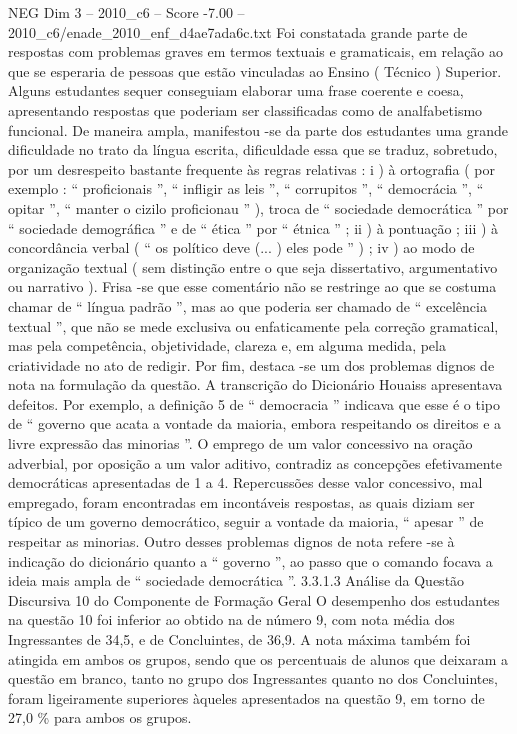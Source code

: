 \begin{textsample}{NEG Dim 3 – 2010\_c6 – Score -7.00 – 2010\_c6/enade\_2010\_enf\_d4ae7ada6c.txt}
Foi constatada grande parte de respostas com problemas graves em termos textuais e gramaticais, em relação ao que se esperaria de pessoas que estão vinculadas ao Ensino ( Técnico ) Superior.
Alguns estudantes sequer conseguiam elaborar uma frase coerente e coesa, apresentando respostas que poderiam ser classificadas como de analfabetismo funcional.
De maneira ampla, manifestou -se da parte dos estudantes uma grande dificuldade no trato da língua escrita, dificuldade essa que se traduz, sobretudo, por um desrespeito bastante frequente às regras relativas : i ) à ortografia ( por exemplo : “ proficionais ”, “ infligir as leis ”, “ corrupitos ”, “ democrácia ”, “ opitar ”, “ manter o cizilo proficionau ” ), troca de “ sociedade democrática ” por “ sociedade demográfica ” e de “ ética ” por “ étnica ” ; ii ) à pontuação ; iii ) à concordância verbal ( “ os político deve (... ) eles pode ” ) ; iv ) ao modo de organização textual ( sem distinção entre o que seja dissertativo, argumentativo ou narrativo ).
Frisa -se que esse comentário não se restringe ao que se costuma chamar de “ língua padrão ”, mas ao que poderia ser chamado de “ excelência textual ”, que não se mede exclusiva ou enfaticamente pela correção gramatical, mas pela competência, objetividade, clareza e, em alguma medida, pela criatividade no ato de redigir.
Por fim, destaca -se um dos problemas dignos de nota na formulação da questão.
A transcrição do Dicionário Houaiss apresentava defeitos.
Por exemplo, a definição 5 de “ democracia ” indicava que esse é o tipo de “ governo que acata a vontade da maioria, embora respeitando os direitos e a livre expressão das minorias ”.
O emprego de um valor concessivo na oração adverbial, por oposição a um valor aditivo, contradiz as concepções efetivamente democráticas apresentadas de 1 a 4.
Repercussões desse valor concessivo, mal empregado, foram encontradas em incontáveis respostas, as quais diziam ser típico de um governo democrático, seguir a vontade da maioria, “ apesar ” de respeitar as minorias.
Outro desses problemas dignos de nota refere -se à indicação do dicionário quanto a “ governo ”, ao passo que o comando focava a ideia mais ampla de “ sociedade democrática ”. 3.3.1.3 Análise da Questão Discursiva 10 do Componente de Formação Geral O desempenho dos estudantes na questão 10 foi inferior ao obtido na de número 9, com nota média dos Ingressantes de 34,5, e de Concluintes, de 36,9.
A nota máxima também foi atingida em ambos os grupos, sendo que os percentuais de alunos que deixaram a questão em branco, tanto no grupo dos Ingressantes quanto no dos Concluintes, foram ligeiramente superiores àqueles apresentados na questão 9, em torno de 27,0 \% para ambos os grupos.

\end{textsample}
